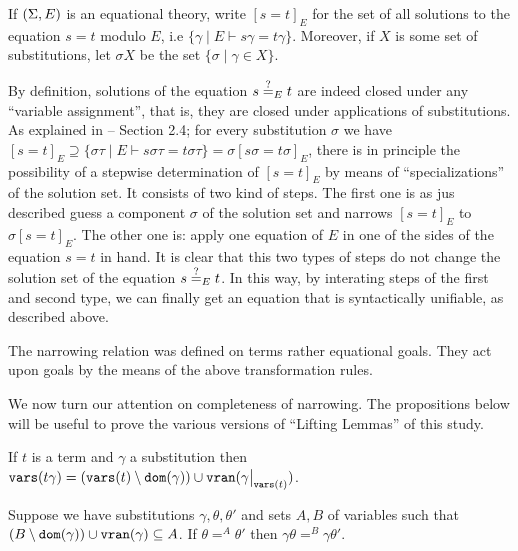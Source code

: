 If $(\Sigma, E)$ is an equational theory, write $[s = t]_E$ for the set of all solutions to the equation $s = t$ modulo $E$, i.e $\{\gamma \mid E \vdash s\gamma = t \gamma \}$. Moreover, if $X$ is some set of substitutions, let $\sigma X$ be the set $\{ \sigma \mid \gamma \in X \}$.

By definition, solutions of the equation $s \eqUnif{E}{?}t$ are indeed closed under any ``variable assignment'', that is, they are closed under applications of substitutions. As explained in \cite{10.1007/BFb0032044} -- Section 2.4; for every substitution $\sigma$ we have $[s = t]_E \supseteq \{ \sigma \tau \mid E \vdash s\sigma \tau = t \sigma \tau  \} = \sigma [s\sigma = t \sigma]_E$, there is in principle the possibility of a stepwise determination of $[s = t]_E$ by means of ``specializations'' of the solution set. It consists of two kind of steps. The first one is as jus described guess a component $\sigma$ of the solution set and narrows $[s = t ]_E$ to $\sigma[s = t]_E$. The other one is: apply one equation of $E$ in one of the sides of the equation $s = t$ in hand. It is clear that this two types of steps do not change the solution set of the equation $s \eqUnif{E}{?} t$. In this way, by interating steps of the first and second type, we can finally get an equation that is syntactically unifiable, as described above.

The narrowing relation was defined on terms rather equational goals. They act upon goals by the means of the above transformation rules.

We now turn our attention on completeness of narrowing. The propositions below will be useful to prove the various versions of ``Lifting Lemmas'' of this study.

\begin{proposition}\label{proposition:varst}
	If $t$ is a term and $\gamma$ a substitution then $\vars{t\gamma} = (\vars{t} \setminus \dom{\gamma}) \cup \vran{\restr{\gamma}{\vars{t}}}$.
\end{proposition}

\begin{proposition}\label{proposition:change-of-domain}
	Suppose we have substitutions $\gamma, \theta, \theta'$ and sets $A,B$ of variables such that $(B \setminus \mathtt{dom}(\gamma)) \cup \mathtt{v}\mathtt{ran}(\gamma) \subseteq A$. If $\theta =^{A} \theta'$ then $\gamma\theta =^{B} \gamma\theta'$.
\end{proposition}

